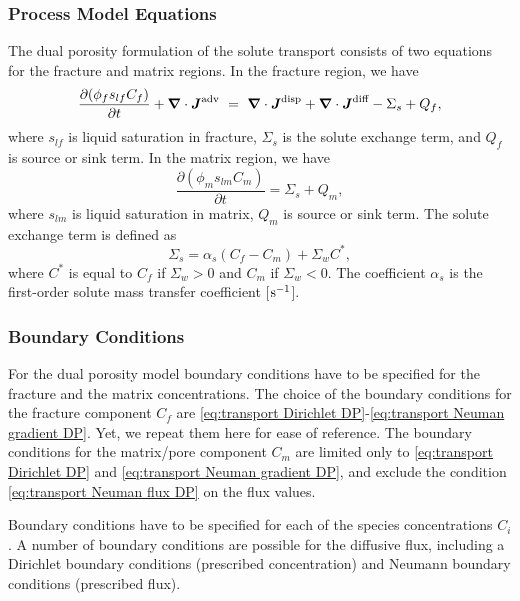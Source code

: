 \subsubsection{Process Model Equations} 

The dual porosity formulation of the solute transport consists of two equations
for the fracture and matrix regions. 
In the fracture region, we have \citep{simunek-vangenuchten_2008}
\begin{equation}  \label{eq:MassConservation}
  \frac{\partial (\phi_f s_{lf} C_f)}{\partial t} 
  + 
  {\boldsymbol{\nabla}} \cdot {\boldsymbol{J}}^\text{adv} \ =\  {\boldsymbol{\nabla}} \cdot {\boldsymbol{J}}^\text{disp} 
  + 
  {\boldsymbol{\nabla}} \cdot {\boldsymbol{J}}^\text{diff} - \Sigma_s + Q_f,
\end{equation}
where $s_{lf}$ is liquid saturation in fracture, 
$\Sigma_s$ is the solute exchange term,
and $Q_f$ is source or sink term.
In the matrix region, we have
$$
  \frac{\partial (\phi_m s_{lm} C_m)}{\partial t}
  = \Sigma_s + Q_m,
$$
where $s_{lm}$ is liquid saturation in matrix, $Q_m$ is source or sink term.
The solute exchange term is defined as
$$
  \Sigma_s = \alpha_s (C_f - C_m) + \Sigma_w C^*,
$$
where $C^*$ is equal to $C_f$ if $\Sigma_w > 0$ and $C_m$ if $\Sigma_w < 0$.
The coefficient $\alpha_s$ is the first-order solute mass transfer coefficient [${\rm s}^{-1}$].



\subsubsection{Boundary Conditions} 
\label{sec:transport-boundary-conditions-dual-porosity}

\noindent 
For the dual porosity model boundary conditions have to be specified 
for the fracture and the matrix concentrations.
The choice of the boundary conditions for the fracture component $C_f$ 
are \eqref{eq:transport Dirichlet DP}-\eqref{eq:transport Neuman gradient DP}.
Yet, we repeat them here for ease of reference.
The boundary conditions for the matrix/pore component $C_m$
are limited only to  \eqref{eq:transport Dirichlet DP} and \eqref{eq:transport Neuman gradient DP}, 
and exclude the condition \eqref{eq:transport Neuman flux DP}
on the flux values.


\noindent 
Boundary conditions have to be specified for each of the species concentrations $C_i$.
A number of boundary conditions are possible for the diffusive flux, 
including a Dirichlet boundary conditions (prescribed concentration) 
and Neumann boundary conditions (prescribed flux). 

